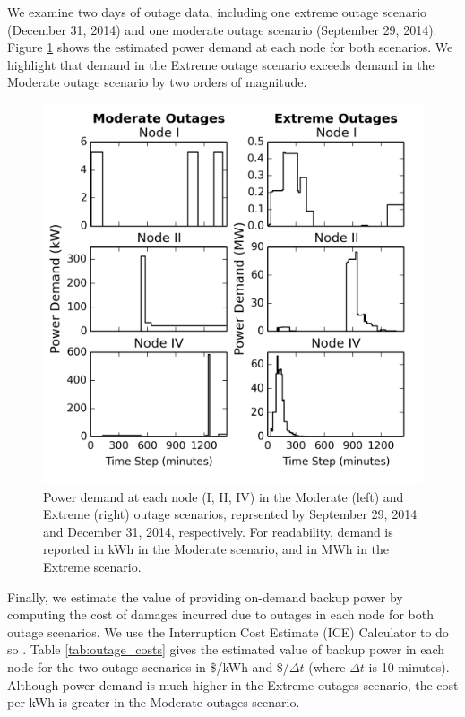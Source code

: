 \documentclass[conference]{IEEEtran}
\begin{document}
We examine two days of outage data, including one extreme outage scenario (December 31, 2014) and one moderate outage scenario (September 29, 2014). Figure \ref{fig:power_demand} shows the estimated power demand at each node for both scenarios. We highlight that demand in the Extreme outage scenario exceeds demand in the Moderate outage scenario by two orders of magnitude.
\begin{figure}[!htbp]
  \begin{center}
  \includegraphics[width=0.8\linewidth]{plots/power_demand.png}
  \end{center}
  \vspace{-5pt}
  \caption{Power demand at each node (I, II, IV) in the Moderate (left) and Extreme (right) outage scenarios, reprsented by September 29, 2014 and December 31, 2014, respectively. For readability, demand is reported in kWh in the Moderate scenario, and in MWh in the Extreme scenario.}
  \label{fig:power_demand}
\end{figure}
Finally, we estimate the value of providing on-demand backup power by computing the cost of damages incurred due to outages in each node for both outage scenarios. We use the Interruption Cost Estimate (ICE) Calculator to do so \cite{ice_calculator_2015}. Table \ref{tab:outage_costs} gives the estimated value of backup power in each node for the two outage scenarios in \$/kWh and \$/$\Delta t$ (where $\Delta t$ is 10 minutes). Although power demand is much higher in the Extreme outages scenario, the cost per kWh is greater in the Moderate outages scenario.
\end{document}
